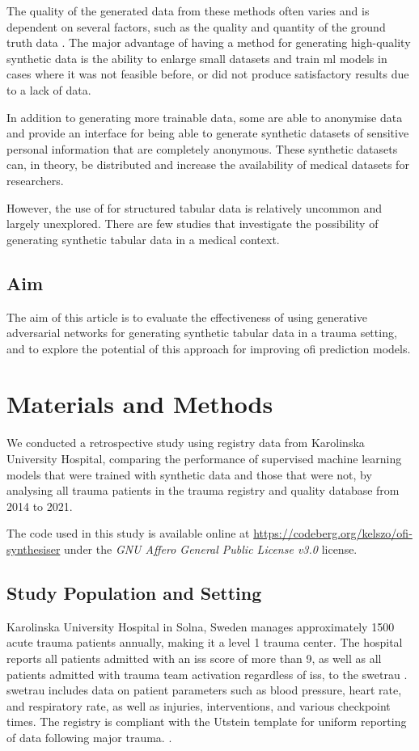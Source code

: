 \documentclass[12pt, letterpaper]{article}
\begin{document}
The quality of the generated data from these methods often varies and is dependent on several factors, such as the quality and quantity of the ground truth data \cite{karras_training_2020}.  The major advantage of having a method for generating high-quality synthetic data is the ability to enlarge small datasets and train \acrshort{ml}  models in cases where it was not feasible before, or did not produce satisfactory results due to a lack of data.

In addition to generating more trainable data, some  are able to anonymise data \cite{liu_ppgan_2019} and provide an interface for being able to generate synthetic datasets of sensitive personal information that are completely anonymous. These synthetic datasets can, in theory, be distributed and increase the availability of medical datasets for researchers.

However, the use of  for structured tabular data is relatively uncommon and largely unexplored. There are few studies that investigate the possibility of generating synthetic tabular data in a medical context.

\subsection{Aim}
The aim of this article is to evaluate the effectiveness of using generative adversarial networks   for generating synthetic tabular data in a trauma setting, and to explore the potential of this approach for improving \acrshort{ofi} prediction models.

\section{Materials and Methods}
We conducted a retrospective study using registry data from Karolinska University Hospital, comparing the performance of supervised machine learning models that were trained with synthetic data and those that were not, by analysing all trauma patients in the trauma registry and quality database from 2014 to 2021.

The code used in this study is available online at \url{https://codeberg.org/kelszo/ofi-synthesiser} under the \textit{GNU Affero General Public License v3.0} license.

\subsection{Study Population and Setting}
Karolinska University Hospital in Solna, Sweden manages approximately 1500 acute trauma patients annually, making it a level 1 trauma center. The hospital reports all patients admitted with an \acrfull{iss} score of more than 9, as well as all patients admitted with trauma team activation regardless of \acrshort{iss}, to the \acrfull{swetrau} \cite{swetrau}. \acrshort{swetrau} includes data on patient parameters such as blood pressure, heart rate, and respiratory rate, as well as injuries, interventions, and various checkpoint times. The registry is compliant with the Utstein template for uniform reporting of data following major trauma. \cite{ringdal_utstein_2008}.
\end{document}
